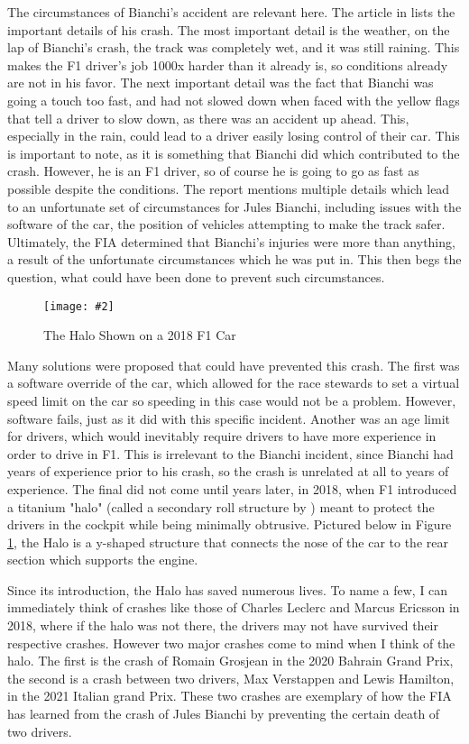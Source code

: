 \documentclass[letterpaper, 12pt]{article}
\numberwithin{figure}{section}
\newcommand{\figref}[4]
{
  \begin{figure}[H]
    \centering
    \texttt{[image: \#2]}
    \caption{#3}
    #4
  \end{figure}
}
\begin{document}
The circumstances of Bianchi's accident are relevant here. The article in \cite{bianchi} lists the important details of his crash. The most important detail is the weather, on the lap of Bianchi's crash, the track was completely wet, and it was still raining. This makes the F1 driver's job 1000x harder than it already is, so conditions already are not in his favor. The next important detail was the fact that Bianchi was going a touch too fast, and had not slowed down when faced with the yellow flags that tell a driver to slow down, as there was an accident up ahead. This, especially in the rain, could lead to a driver easily losing control of their car. This is important to note, as it is something that Bianchi did which contributed to the crash. However, he is an F1 driver, so of course he is going to go as fast as possible despite the conditions. The report mentions multiple details which lead to an unfortunate set of circumstances for Jules Bianchi, including issues with the software of the car, the position of vehicles attempting to make the track safer. Ultimately, the FIA determined that Bianchi's injuries were more than anything, a result of the unfortunate circumstances which he was put in. This then begs the question, what could have been done to prevent such circumstances.

\figref{8}{halo}{The Halo Shown on a 2018 F1 Car \cite{halopic}}{\label{fig:1}}
Many solutions were proposed that could have prevented this crash. The first was a software override of the car, which allowed for the race stewards to set a virtual speed limit on the car so speeding in this case would not be a problem. However, software fails, just as it did with this specific incident. Another was an age limit for drivers, which would inevitably require drivers to have more experience in order to drive in F1. This is irrelevant to the Bianchi incident, since Bianchi had years of experience prior to his crash, so the crash is unrelated at all to years of experience. The final did not come until years later, in 2018, when F1 introduced a titanium "halo" (called a secondary roll structure by \cite{fia2018}) meant to protect the drivers in the cockpit while being minimally obtrusive. Pictured below in Figure \ref{fig:1}, the Halo is a y-shaped structure that connects the nose of the car to the rear section which supports the engine. 

Since its introduction, the Halo has saved numerous lives. To name a few, I can immediately think of crashes like those of Charles Leclerc and Marcus Ericsson in 2018, where if the halo was not there, the drivers may not have survived their respective crashes. However two major crashes come to mind when I think of the halo. The first is the crash of Romain Grosjean in the 2020 Bahrain Grand Prix, the second is a crash between two drivers, Max Verstappen and Lewis Hamilton, in the 2021 Italian grand Prix. These two crashes are exemplary of how the FIA has learned from the crash of Jules Bianchi by preventing the certain death of two drivers.
\end{document}
